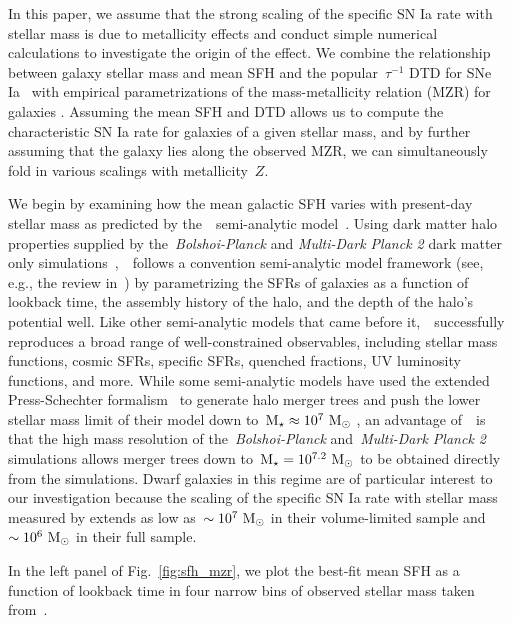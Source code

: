 \documentclass[ms.tex]{subfiles}
\begin{document}
In this paper, we assume that the strong scaling of the specific SN Ia rate
with stellar mass is due to metallicity effects and conduct simple numerical
calculations to investigate the origin of the effect.
We combine the relationship between galaxy stellar mass and mean SFH and the
popular~$\tau^{-1}$ DTD for SNe Ia~\citep[e.g.][]{Maoz2012a} with empirical
parametrizations of the mass-metallicity relation (MZR) for galaxies
\citep{Tremonti2004, Andrews2013, Zahid2011, Zahid2014}.
Assuming the mean SFH and DTD allows us to compute the characteristic SN Ia
rate for galaxies of a given stellar mass, and by further assuming that the
galaxy lies along the observed MZR, we can simultaneously fold in various
scalings with metallicity~$Z$.
\par
We begin by examining how the mean galactic SFH varies with present-day stellar
mass as predicted by the~\um~semi-analytic model~\citep{Behroozi2019}.
Using dark matter halo properties supplied by the~\textit{Bolshoi-Planck} and
\textit{Multi-Dark Planck 2} dark matter only simulations~\citep{Klypin2016,
RodriguezPuebla2016},~\um~follows a convention semi-analytic model framework
(see, e.g., the review in~\citealt{Somerville2015a}) by parametrizing the SFRs
of galaxies as a function of lookback time, the assembly history of the halo,
and the depth of the halo's potential well.
Like other semi-analytic models that came before it,~\um~successfully
reproduces a broad range of well-constrained observables, including stellar
mass functions, cosmic SFRs, specific SFRs, quenched fractions, UV luminosity
functions, and more.
While some semi-analytic models have used the extended Press-Schechter
formalism~\citep{Press1974, Bond1991} to generate halo merger trees and push
the lower stellar mass limit of their model down to~$\text{M}_\star \approx 10^7~\text{M}_\odot$
\citep[e.g.][]{Somerville2015b}, an advantage of~\um~is that the high mass
resolution of the~\textit{Bolshoi-Planck} and~\textit{Multi-Dark Planck 2}
simulations allows merger trees down to~$\text{M}_\star = 10^{7.2}~\text{M}_\odot$ to be
obtained directly from the simulations.
Dwarf galaxies in this regime are of particular interest to our investigation
because the scaling of the specific SN Ia rate with stellar mass measured by
\citet{Brown2019} extends as low as~$\sim 10^7~\text{M}_\odot$ in their volume-limited
sample and~$\sim 10^6~\text{M}_\odot$ in their full sample.
\par
In the left panel of Fig.~\ref{fig:sfh_mzr}, we plot the best-fit mean SFH as a
function of lookback time in four narrow bins of observed stellar mass taken
from~\um.
\end{document}
